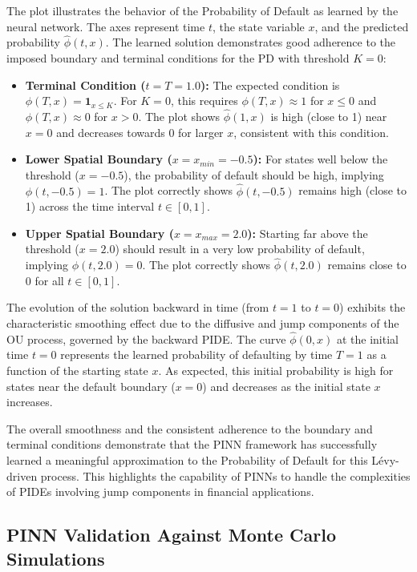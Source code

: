 \documentclass[11pt,twoside,openright]{report}
\begin{document}
The plot illustrates the behavior of the Probability of Default as learned by the neural network. The axes represent time $t$, the state variable $x$, and the predicted probability $\hat{\phi}(t, x)$. The learned solution demonstrates good adherence to the imposed boundary and terminal conditions for the PD with threshold $K=0$:
 
\begin{itemize}
    \item \textbf{Terminal Condition ($t=T=1.0$):} The expected condition is $\phi(T, x) = \mathbf{1}_{x \le K}$. For $K=0$, this requires $\phi(T, x) \approx 1$ for $x \le 0$ and $\phi(T, x) \approx 0$ for $x > 0$. The plot shows $\hat{\phi}(1, x)$ is high (close to 1) near $x=0$ and decreases towards 0 for larger $x$, consistent with this condition.
    \item \textbf{Lower Spatial Boundary ($x=x_{min}=-0.5$):} For states well below the threshold ($x=-0.5$), the probability of default should be high, implying $\phi(t, -0.5) = 1$. The plot correctly shows $\hat{\phi}(t, -0.5)$ remains high (close to 1) across the time interval $t \in [0, 1]$.
    \item \textbf{Upper Spatial Boundary ($x=x_{max}=2.0$):} Starting far above the threshold ($x=2.0$) should result in a very low probability of default, implying $\phi(t, 2.0) = 0$. The plot correctly shows $\hat{\phi}(t, 2.0)$ remains close to 0 for all $t \in [0, 1]$.
\end{itemize}
 
The evolution of the solution backward in time (from $t=1$ to $t=0$) exhibits the characteristic smoothing effect due to the diffusive and jump components of the OU process, governed by the backward PIDE. The curve $\hat{\phi}(0, x)$ at the initial time $t=0$ represents the learned probability of defaulting by time $T=1$ as a function of the starting state $x$. As expected, this initial probability is high for states near the default boundary ($x=0$) and decreases as the initial state $x$ increases.
 
The overall smoothness and the consistent adherence to the boundary and terminal conditions demonstrate that the PINN framework has successfully learned a meaningful approximation to the Probability of Default for this Lévy-driven process. This highlights the capability of PINNs to handle the complexities of PIDEs involving jump components in financial applications.

\subsection{PINN Validation Against Monte Carlo Simulations}
\label{sec:pinn_validation}
\end{document}
